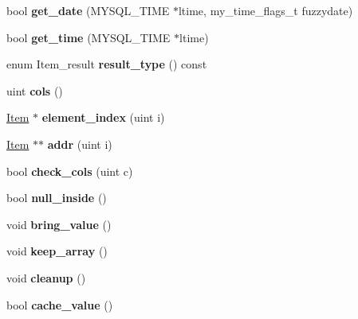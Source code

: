\begin{DoxyCompactItemize}
bool {\bfseries get\+\_\+date} (M\+Y\+S\+Q\+L\+\_\+\+T\+I\+ME $\ast$ltime, my\+\_\+time\+\_\+flags\+\_\+t fuzzydate)
\item 
\mbox{\label{classItem__cache__row_a5a491d39cf2efa2d2303c53ee7cd4cc7}} 
bool {\bfseries get\+\_\+time} (M\+Y\+S\+Q\+L\+\_\+\+T\+I\+ME $\ast$ltime)
\item 
\mbox{\label{classItem__cache__row_af23deb75754d4bb726f229388063f2b8}} 
enum Item\+\_\+result {\bfseries result\+\_\+type} () const
\item 
\mbox{\label{classItem__cache__row_a2833aac68ff2baf0f0860b751e6f171c}} 
uint {\bfseries cols} ()
\item 
\mbox{\label{classItem__cache__row_a25317d5d3601a45e0e3681fd02b22ee2}} 
\mbox{\hyperlink{classItem}{Item}} $\ast$ {\bfseries element\+\_\+index} (uint i)
\item 
\mbox{\label{classItem__cache__row_ad4f16cdb36da753723c1e2e2327f8ff9}} 
\mbox{\hyperlink{classItem}{Item}} $\ast$$\ast$ {\bfseries addr} (uint i)
\item 
\mbox{\label{classItem__cache__row_a6aad3885da9aab775b011e440994f12b}} 
bool {\bfseries check\+\_\+cols} (uint c)
\item 
\mbox{\label{classItem__cache__row_a6f35d411decd254f1e07858df465d25e}} 
bool {\bfseries null\+\_\+inside} ()
\item 
\mbox{\label{classItem__cache__row_a665d6682241e793f46e7d53346bf70c1}} 
void {\bfseries bring\+\_\+value} ()
\item 
\mbox{\label{classItem__cache__row_a350a3003b6b3ffaef1d5128ff9396110}} 
void {\bfseries keep\+\_\+array} ()
\item 
\mbox{\label{classItem__cache__row_a90f5c3572c253bd7d970eeaf43f36fa4}} 
void {\bfseries cleanup} ()
\item 
\mbox{\label{classItem__cache__row_a4046ce52b3bd0284686a48a3397e3dbe}} 
bool {\bfseries cache\+\_\+value} ()
\end{DoxyCompactItemize}
